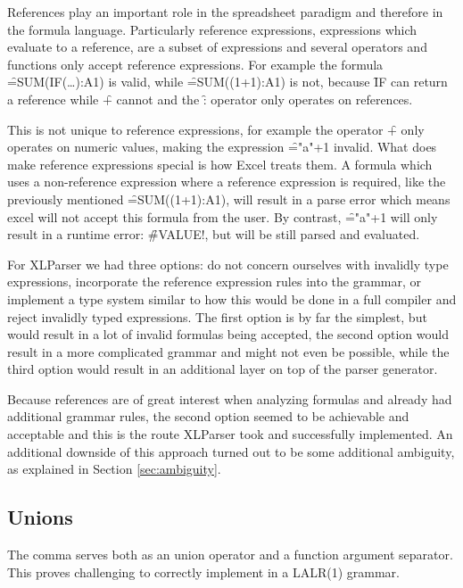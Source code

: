 References play an important role in the spreadsheet paradigm and therefore in the formula language.
Particularly reference expressions, expressions which evaluate to a reference, are a subset of expressions and several operators and functions only accept reference expressions.
For example the formula \f{=SUM(IF(\ldots):A1)} is valid, while \f{=SUM((1+1):A1)} is not, because \f{IF} can return a reference while \f{+} cannot and the \f{:} operator only operates on references.

This is not unique to reference expressions, for example the operator \f{+} only operates on numeric values, making the expression \f{="a"+1} invalid.
What does make reference expressions special is how Excel treats them.
A formula which uses a non-reference expression where a reference expression is required, like the previously mentioned \f{=SUM((1+1):A1)}, will result in a parse error which means excel will not accept this formula from the user.
By contrast, \f{="a"+1} will only result in a runtime error: \f{\#VALUE!}, but will be still parsed and evaluated.

\newpage

For XLParser we had three options: do not concern ourselves with invalidly type expressions, incorporate the reference expression rules into the grammar, or implement a type system similar to how this would be done in a full compiler and reject invalidly typed expressions.
The first option is by far the simplest, but would result in a lot of invalid formulas being accepted, the second option would result in a more complicated grammar and might not even be possible, while the third option would result in an additional layer on top of the parser generator.

Because references are of great interest when analyzing formulas and already had additional grammar rules, the second option seemed to be achievable and acceptable and this is the route XLParser took and successfully implemented.
An additional downside of this approach turned out to be some additional ambiguity, as explained in Section \ref{sec:ambiguity}.

\subsection{Unions}
\label{subsec:desing:unions}

The comma serves both as an union operator and a function argument separator.
This proves challenging to correctly implement in a LALR(1) grammar.

